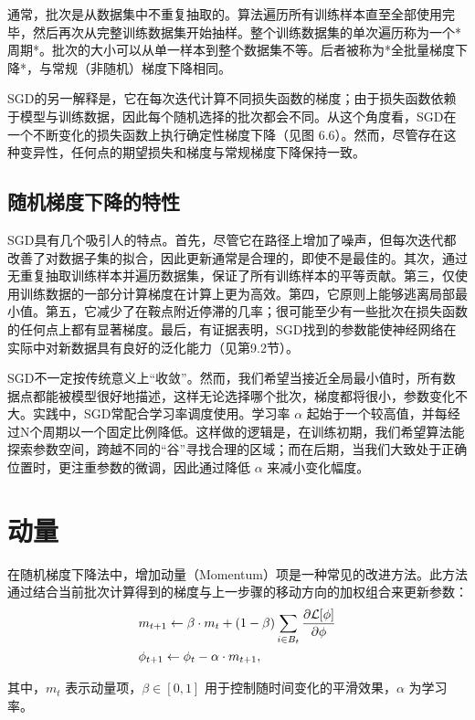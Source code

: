 \documentclass[lang=cn,newtx,10pt,scheme=chinese]{elegantbook}
\begin{document}
通常，批次是从数据集中不重复抽取的。算法遍历所有训练样本直至全部使用完毕，然后再次从完整训练数据集开始抽样。整个训练数据集的单次遍历称为一个*周期*。批次的大小可以从单一样本到整个数据集不等。后者被称为*全批量梯度下降*，与常规（非随机）梯度下降相同。

SGD的另一解释是，它在每次迭代计算不同损失函数的梯度；由于损失函数依赖于模型与训练数据，因此每个随机选择的批次都会不同。从这个角度看，SGD在一个不断变化的损失函数上执行确定性梯度下降（见图 6.6）。然而，尽管存在这种变异性，任何点的期望损失和梯度与常规梯度下降保持一致。


\subsection{随机梯度下降的特性}
SGD具有几个吸引人的特点。首先，尽管它在路径上增加了噪声，但每次迭代都改善了对数据子集的拟合，因此更新通常是合理的，即使不是最佳的。其次，通过无重复抽取训练样本并遍历数据集，保证了所有训练样本的平等贡献。第三，仅使用训练数据的一部分计算梯度在计算上更为高效。第四，它原则上能够逃离局部最小值。第五，它减少了在鞍点附近停滞的几率；很可能至少有一些批次在损失函数的任何点上都有显著梯度。最后，有证据表明，SGD找到的参数能使神经网络在实际中对新数据具有良好的泛化能力（见第9.2节）。

SGD不一定按传统意义上“收敛”。然而，我们希望当接近全局最小值时，所有数据点都能被模型很好地描述，这样无论选择哪个批次，梯度都将很小，参数变化不大。实践中，SGD常配合学习率调度使用。学习率 \(\alpha\) 起始于一个较高值，并每经过N个周期以一个固定比例降低。这样做的逻辑是，在训练初期，我们希望算法能探索参数空间，跨越不同的“谷”寻找合理的区域；而在后期，当我们大致处于正确位置时，更注重参数的微调，因此通过降低 \(\alpha\) 来减小变化幅度。

\section{动量}
在随机梯度下降法中，增加动量（Momentum）项是一种常见的改进方法。此方法通过结合当前批次计算得到的梯度与上一步骤的移动方向的加权组合来更新参数：
\begin{align}
& m_{t+1} \leftarrow \beta \cdot m_t + (1 - \beta) \sum_{i \in B_t} \frac{\partial \mathcal{L}[\phi]}{\partial \phi} \notag \\
& \phi_{t+1} \leftarrow \phi_t - \alpha \cdot m_{t+1},
\end{align}

其中，\(m_t\) 表示动量项，\(\beta \in [0,1]\) 用于控制随时间变化的平滑效果，\(\alpha\) 为学习率。
\end{document}
